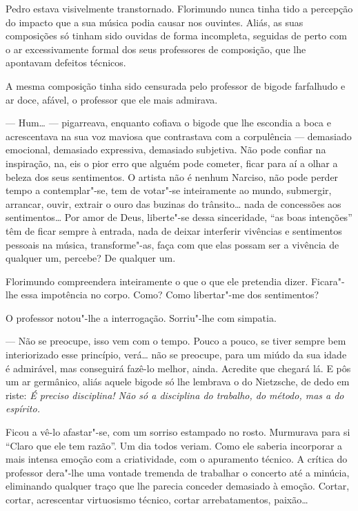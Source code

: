 Pedro estava visivelmente transtornado. Florimundo nunca tinha tido a
percepção do impacto que a sua música podia causar nos ouvintes. Aliás,
as suas composições só tinham sido ouvidas de forma incompleta, seguidas
de perto com o ar excessivamente formal dos seus professores de
composição, que lhe apontavam defeitos técnicos.

A mesma composição tinha sido censurada pelo professor de bigode
farfalhudo e ar doce, afável, o professor que ele mais admirava.

--- Hum\ldots{} --- pigarreava, enquanto cofiava o bigode que lhe escondia a boca
e acrescentava na sua voz maviosa que contrastava com a corpulência ---
demasiado emocional, demasiado expressiva, demasiado subjetiva. Não
pode confiar na inspiração, na, eis o pior erro que alguém pode cometer,
ficar para aí a olhar a beleza dos seus sentimentos. O artista não é
nenhum Narciso, não pode perder tempo a contemplar"-se, tem de votar"-se
inteiramente ao mundo, submergir, arrancar, ouvir, extrair o ouro das
buzinas do trânsito\ldots{} nada de concessões aos sentimentos\ldots{} Por amor de
Deus, liberte"-se dessa sinceridade, ``as boas intenções'' têm de ficar
sempre à entrada, nada de deixar interferir vivências e sentimentos
pessoais na música, transforme"-as, faça com que elas possam ser a
vivência de qualquer um, percebe? De qualquer um.

Florimundo compreendera inteiramente o que o que ele pretendia dizer.
Ficara"-lhe essa impotência no corpo. Como? Como libertar"-me dos
sentimentos?

O professor notou"-lhe a interrogação. Sorriu"-lhe com simpatia.

--- Não se preocupe, isso vem com o tempo. Pouco a pouco, se tiver sempre
bem interiorizado esse princípio, verá\ldots{} não se preocupe, para um miúdo
da sua idade é admirável, mas conseguirá fazê-lo melhor, ainda. Acredite
que chegará lá. E pôs um ar germânico, aliás aquele bigode só lhe
lembrava o do Nietzsche, de dedo em riste: \emph{É preciso disciplina! Não só
a disciplina do trabalho, do método, mas a do espírito.}

Ficou a vê-lo afastar"-se, com um sorriso estampado no rosto. Murmurava
para si ``Claro que ele tem razão''. Um dia todos veriam. Como ele saberia
incorporar a mais intensa emoção com a criatividade, com o apuramento
técnico. A crítica do professor dera"-lhe uma vontade tremenda de
trabalhar o concerto até a minúcia, eliminando qualquer traço que lhe
parecia conceder demasiado à emoção. Cortar, cortar, acrescentar
virtuosismo técnico, cortar arrebatamentos, paixão\ldots{}

